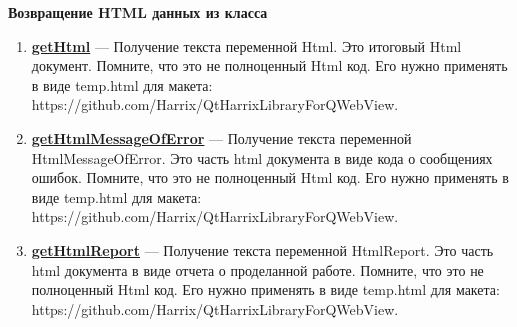\documentclass[a4paper,12pt]{article}
\begin{document}
\textbf{Возвращение HTML данных из класса}
\begin{enumerate}

\item \textbf{\hyperref[getHtml]{getHtml}} --- Получение текста переменной Html. Это итоговый Html документ. Помните, что это не полноценный Html код. Его нужно применять в виде temp.html для макета:      https://github.com/Harrix/QtHarrixLibraryForQWebView.

\item \textbf{\hyperref[getHtmlMessageOfError]{getHtmlMessageOfError}} --- Получение текста переменной HtmlMessageOfError. Это часть html документа в виде кода о сообщениях ошибок. Помните, что это не полноценный Html код. Его нужно применять в виде temp.html для макета: https://github.com/Harrix/QtHarrixLibraryForQWebView.

\item \textbf{\hyperref[getHtmlReport]{getHtmlReport}} --- Получение текста переменной HtmlReport. Это часть html документа в виде отчета о проделанной работе. Помните, что это не полноценный Html код. Его нужно применять в виде temp.html для макета: https://github.com/Harrix/QtHarrixLibraryForQWebView.

\end{enumerate}
\end{document}
